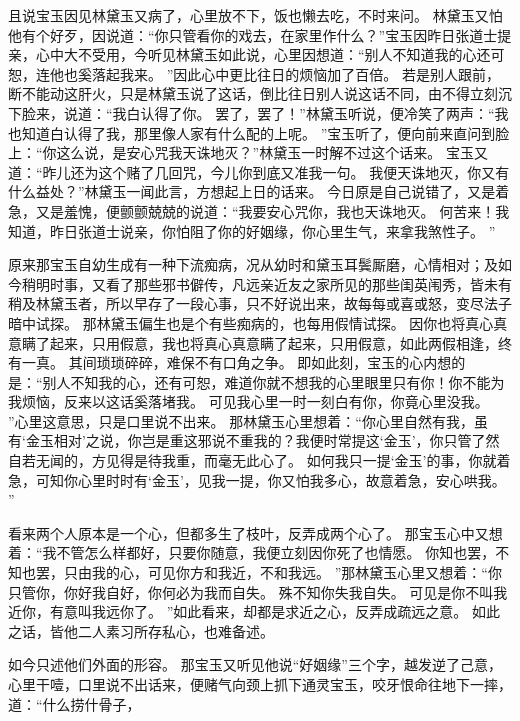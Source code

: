 \par
且说宝玉因见林黛玉又病了，心里放不下，饭也懒去吃，不时来问。
林黛玉又怕他有个好歹，因说道：“你只管看你的戏去，在家里作什么？”宝玉因昨日张道士提亲，心中大不受用，今听见林黛玉如此说，心里因想道：“别人不知道我的心还可恕，连他也奚落起我来。
”因此心中更比往日的烦恼加了百倍。
若是别人跟前，断不能动这肝火，只是林黛玉说了这话，倒比往日别人说这话不同，由不得立刻沉下脸来，说道：“我白认得了你。
罢了，罢了！”林黛玉听说，便冷笑了两声：“我也知道白认得了我，那里像人家有什么配的上呢。
”宝玉听了，便向前来直问到脸上：“你这么说，是安心咒我天诛地灭？”林黛玉一时解不过这个话来。
宝玉又道：“昨儿还为这个赌了几回咒，今儿你到底又准我一句。
我便天诛地灭，你又有什么益处？”林黛玉一闻此言，方想起上日的话来。
今日原是自己说错了，又是着急，又是羞愧，便颤颤兢兢的说道：“我要安心咒你，我也天诛地灭。
何苦来！我知道，昨日张道士说亲，你怕阻了你的好姻缘，你心里生气，来拿我煞性子。
”\par
原来那宝玉自幼生成有一种下流痴病，况从幼时和黛玉耳鬓厮磨，心情相对；及如今稍明时事，又看了那些邪书僻传，凡远亲近友之家所见的那些闺英闱秀，皆未有稍及林黛玉者，所以早存了一段心事，只不好说出来，故每每或喜或怒，变尽法子暗中试探。
那林黛玉偏生也是个有些痴病的，也每用假情试探。
因你也将真心真意瞒了起来，只用假意，我也将真心真意瞒了起来，只用假意，如此两假相逢，终有一真。
其间琐琐碎碎，难保不有口角之争。
即如此刻，宝玉的心内想的是：“别人不知我的心，还有可恕，难道你就不想我的心里眼里只有你！你不能为我烦恼，反来以这话奚落堵我。
可见我心里一时一刻白有你，你竟心里没我。
”心里这意思，只是口里说不出来。
那林黛玉心里想着：“你心里自然有我，虽有‘金玉相对’之说，你岂是重这邪说不重我的？我便时常提这‘金玉’，你只管了然自若无闻的，方见得是待我重，而毫无此心了。
如何我只一提‘金玉’的事，你就着急，可知你心里时时有‘金玉’，见我一提，你又怕我多心，故意着急，安心哄我。
”\par
看来两个人原本是一个心，但都多生了枝叶，反弄成两个心了。
那宝玉心中又想着：“我不管怎么样都好，只要你随意，我便立刻因你死了也情愿。
你知也罢，不知也罢，只由我的心，可见你方和我近，不和我远。
”那林黛玉心里又想着：“你只管你，你好我自好，你何必为我而自失。
殊不知你失我自失。
可见是你不叫我近你，有意叫我远你了。
”如此看来，却都是求近之心，反弄成疏远之意。
如此之话，皆他二人素习所存私心，也难备述。
\par
如今只述他们外面的形容。
那宝玉又听见他说“好姻缘”三个字，越发逆了己意，心里干噎，口里说不出话来，便赌气向颈上抓下通灵宝玉，咬牙恨命往地下一摔，道：“什么捞什骨子，
